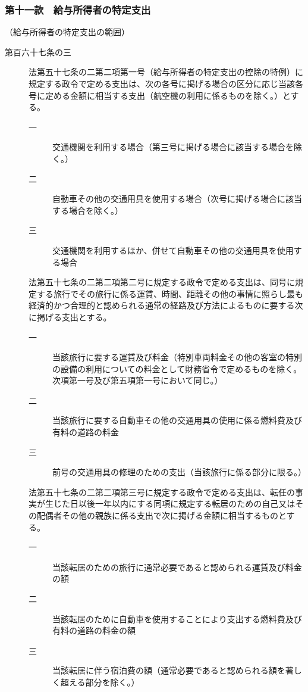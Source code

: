 \documentclass[twocolumn,a4j,10pt]{ltjtarticle}
\begin{document}
\subsubsection*{第十一款　給与所得者の特定支出}
\noindent\hspace{10pt}（給与所得者の特定支出の範囲）
\begin{description}
\item[第百六十七条の三]法第五十七条の二第二項第一号（給与所得者の特定支出の控除の特例）に規定する政令で定める支出は、次の各号に掲げる場合の区分に応じ当該各号に定める金額に相当する支出（航空機の利用に係るものを除く。）とする。
\begin{description}
\item[一]交通機関を利用する場合（第三号に掲げる場合に該当する場合を除く。）
\item[二]自動車その他の交通用具を使用する場合（次号に掲げる場合に該当する場合を除く。）
\item[三]交通機関を利用するほか、併せて自動車その他の交通用具を使用する場合
\end{description}
\item[]法第五十七条の二第二項第二号に規定する政令で定める支出は、同号に規定する旅行でその旅行に係る運賃、時間、距離その他の事情に照らし最も経済的かつ合理的と認められる通常の経路及び方法によるものに要する次に掲げる支出とする。
\begin{description}
\item[一]当該旅行に要する運賃及び料金（特別車両料金その他の客室の特別の設備の利用についての料金として財務省令で定めるものを除く。次項第一号及び第五項第一号において同じ。）
\item[二]当該旅行に要する自動車その他の交通用具の使用に係る燃料費及び有料の道路の料金
\item[三]前号の交通用具の修理のための支出（当該旅行に係る部分に限る。）
\end{description}
\item[]法第五十七条の二第二項第三号に規定する政令で定める支出は、転任の事実が生じた日以後一年以内にする同項に規定する転居のための自己又はその配偶者その他の親族に係る支出で次に掲げる金額に相当するものとする。
\begin{description}
\item[一]当該転居のための旅行に通常必要であると認められる運賃及び料金の額
\item[二]当該転居のために自動車を使用することにより支出する燃料費及び有料の道路の料金の額
\item[三]当該転居に伴う宿泊費の額（通常必要であると認められる額を著しく超える部分を除く。）

\end{description}
\end{description}
\end{document}
